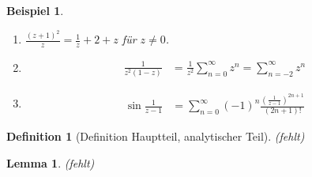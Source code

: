 \documentclass[11pt, a4paper]{article}
\theoremstyle{plain}
\newtheorem{definition}[blockelement]{Definition}
\newtheorem{lemma}[blockelement]{Lemma}
\newtheorem{beispiel}[blockelement]{Beispiel}
\numberwithin{equation}{subsection}
\newcommand{\pair}[1]{\left(#1\right)}
\newcommand{\theoremescape}{\leavevmode}
\begin{document}
    \begin{beispiel}
        \theoremescape
        \begin{enumerate}
            \item $\frac{\pair{z+1}^2}{z} = \frac{1}{z} + 2 + z$ für $z\neq 0$.
            \item
            \begin{align*}
                \frac{1}{z^2\pair{1-z}} &= \frac{1}{z^2} \sum_{n=0}^{\infty} z^n = \sum_{n=-2}^{\infty} z^n
            \end{align*}
            \item
            \begin{align*}
                \sin \frac{1}{z-1} &= \sum_{n=0}^{\infty} \pair{-1}^{n} \frac{\pair{\frac{1}{z-1}}^{2n+1}}{(2n+1)!}
            \end{align*}
        \end{enumerate}
    \end{beispiel}

    \begin{definition}[Definition Hauptteil, analytischer Teil] %
        \marginnote{[17. Jun]}
        (fehlt)
    \end{definition}

    \begin{lemma} %
    (fehlt)
    \end{lemma}
\end{document}
